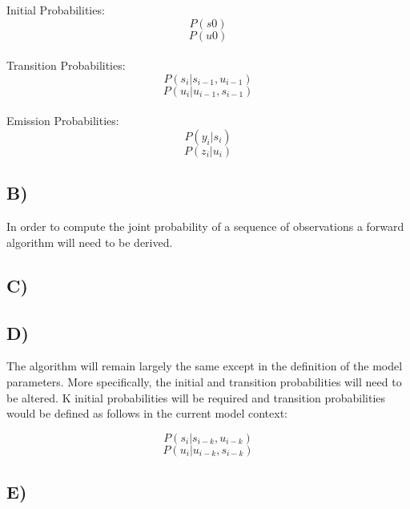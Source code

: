 \documentclass{report}
\begin{document}
Initial Probabilities:
\begin{equation}
  P(s0)
\end{equation}
\begin{equation}
  P(u0)
\end{equation}\\

Transition Probabilities:
\begin{equation}
  P(s_i | s_{i-1}, u_{i-1})
\end{equation}
\begin{equation}
  P(u_i | u_{i-1}, s_{i-1})
\end{equation}\\

Emission Probabilities:
\begin{equation}
  P(y_i | s_i)
\end{equation}
\begin{equation}
  P(z_i | u_i)
\end{equation}

\subsection*{B)}
In order to compute the joint probability of a sequence of observations a
forward algorithm will need to be derived.

\subsection*{C)}

\subsection*{D)}
The algorithm will remain largely the same except in the definition of the model
parameters. More specifically, the initial and transition probabilities will need
to be altered. K initial probabilities will be required and transition probabilities
would be defined as follows in the current model context:

\begin{equation}
  P(s_i | s_{i-k}, u_{i-k})
\end{equation}
\begin{equation}
  P(u_i | u_{i-k}, s_{i-k})
\end{equation}
\subsection*{E)}
\end{document}
